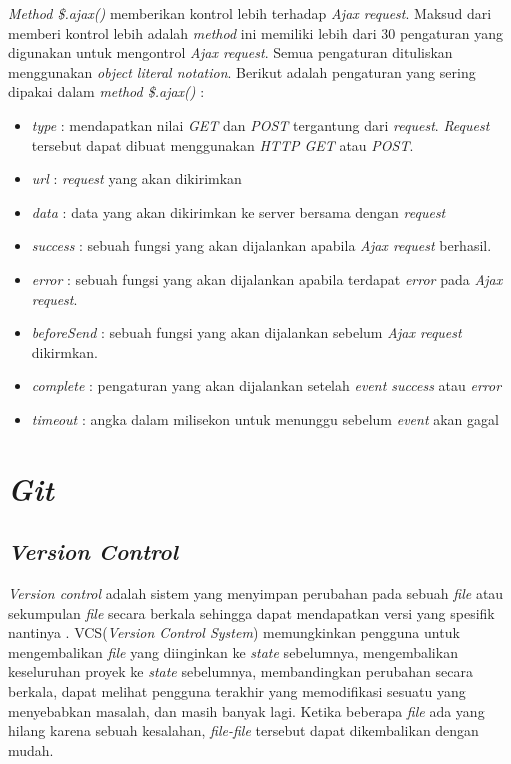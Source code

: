 \textit{Method \$.ajax()} memberikan kontrol lebih terhadap \textit{Ajax request}. Maksud dari memberi kontrol lebih adalah \textit{method} ini memiliki lebih dari 30 pengaturan yang digunakan untuk mengontrol \textit{Ajax request}. Semua pengaturan dituliskan menggunakan \textit{object literal notation}. Berikut adalah pengaturan yang sering dipakai dalam \textit{method \$.ajax()} :

\begin{itemize}
	\item \textit{type} : mendapatkan nilai \textit{GET} dan \textit{POST} tergantung dari \textit{request}. \textit{Request} tersebut dapat dibuat menggunakan \textit{HTTP GET} atau \textit{POST}.
	\item \textit{url} : \textit{request} yang akan dikirimkan
	\item \textit{data} : data yang akan dikirimkan ke server bersama dengan \textit{request}
	\item \textit{success} : sebuah fungsi yang akan dijalankan apabila \textit{Ajax request} berhasil. 
	\item \textit{error} : sebuah fungsi yang akan dijalankan apabila terdapat \textit{error} pada \textit{Ajax request}. 
	\item \textit{beforeSend} : sebuah fungsi yang akan dijalankan sebelum \textit{Ajax request} dikirmkan.
	\item \textit{complete} : pengaturan yang akan dijalankan setelah \textit{event success} atau \textit{error}
	\item \textit{timeout} : angka dalam milisekon untuk menunggu sebelum \textit{event} akan gagal
\end{itemize}

\section{\textit{Git}}
\label{sec:Git}

\subsection{\textit{Version Control}}
\textit{Version control} adalah sistem yang menyimpan perubahan pada sebuah \textit{file} atau sekumpulan \textit{file} secara berkala sehingga dapat mendapatkan versi yang spesifik nantinya \cite{chacon2014pro}. VCS(\textit{Version Control System}) memungkinkan pengguna untuk mengembalikan \textit{file} yang diinginkan ke \textit{state} sebelumnya, mengembalikan keseluruhan proyek ke \textit{state} sebelumnya, membandingkan perubahan secara berkala, dapat melihat pengguna terakhir yang memodifikasi sesuatu yang menyebabkan masalah, dan masih banyak lagi. Ketika beberapa \textit{file} ada yang hilang karena sebuah kesalahan, \textit{file-file} tersebut dapat dikembalikan dengan mudah. 

